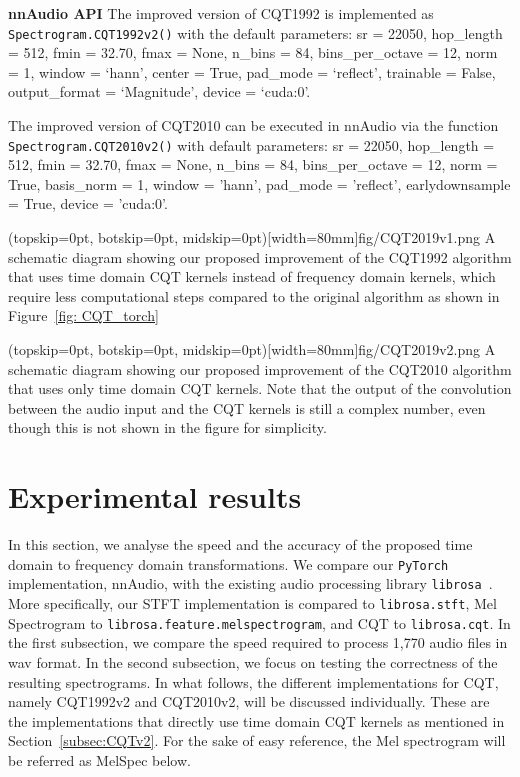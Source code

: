 \documentclass{ieeeaccess}
\newcommand{\nbh}[1]{\texttt{#1}}
\begin{document}
\noindent \textbf{nnAudio API} The improved version of CQT1992 is implemented as \nbh{Spectrogram.CQT1992v2()} with the default parameters: sr = 22050, hop\_length = 512, fmin = 32.70, fmax = None, n\_bins = 84, bins\_per\_octave = 12, norm = 1, window = `hann', center = True, pad\_mode = `reflect', trainable = False, output\_format = `Magnitude', device = `cuda:0'. 

The improved version of CQT2010 can be executed in nnAudio via the function \nbh{Spectrogram.CQT2010v2()} with default parameters: sr = 22050, hop\_length = 512, fmin = 32.70, fmax = None, n\_bins = 84, bins\_per\_octave = 12, norm = True, basis\_norm = 1, window = 'hann', pad\_mode = 'reflect', earlydownsample = True, device = 'cuda:0'.

\Figure(topskip=0pt, botskip=0pt, midskip=0pt)[width=80mm]{fig/CQT2019v1.png}
{A schematic diagram showing our proposed improvement of the CQT1992 algorithm that uses time domain CQT kernels instead of frequency domain kernels, which require less computational steps compared to the original algorithm as shown in Figure~\ref{fig: CQT_torch}\label{fig: CQT2010v1}}

\Figure(topskip=0pt, botskip=0pt, midskip=0pt)[width=80mm]{fig/CQT2019v2.png}
{A schematic diagram showing our proposed improvement of the CQT2010 algorithm that uses only time domain CQT kernels. Note that the output of the convolution between the audio input and the CQT kernels is still a complex number, even though this is not shown in the figure for simplicity. \label{fig: CQT2010v2}}



\section{Experimental results}\label{sec: Result}
In this section, we analyse the speed and the accuracy of the proposed time domain to frequency domain transformations. We compare our \nbh{PyTorch} implementation, nnAudio, with the existing audio processing library \nbh{librosa}~\cite{mcfee2015Librosa}. More specifically, our STFT implementation is compared to \nbh{librosa.stft}, Mel Spectrogram to \nbh{librosa.feature.melspectrogram}, and CQT to \nbh{librosa.cqt}. In the first subsection, we compare the speed required to  process 1,770 audio files in wav format. In the second subsection, we focus on testing the correctness of the resulting spectrograms.  In what follows, the different implementations for CQT,  namely CQT1992v2 and CQT2010v2, will be discussed individually. These are the implementations that directly use time domain CQT kernels as mentioned in Section~\ref{subsec:CQTv2}. For the sake of easy reference, the Mel spectrogram will be referred as MelSpec below.
\end{document}
